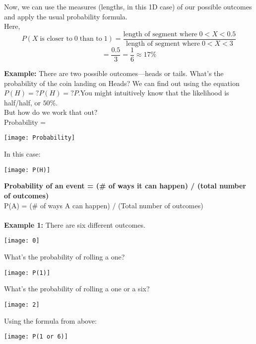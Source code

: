 \documentclass{article}
\begin{document}
\noindent Now, we can use the measures (lengths, in this 1D case) of our possible outcomes and apply the usual probability formula. \\ Here, \[P(X \;  \text{is closer to} \; 0 \; \text{than to} \; 1) = \frac{\text{length of segment where} \; 0<X<0.5}{\text{length of segment where} \; 0<X<3}\]
\[= \frac{0.5}{3} = \frac{1}{6} \approx 17\%\]

\noindent \textbf{Example:} There are two possible outcomes—heads or tails.
What’s the probability of the coin landing on Heads? We can find out using the equation $P(H) = ?P(H)=?P$.You might intuitively know that the likelihood is half/half, or $50$\%.\\

\noindent But how do we work that out?\\ Probability = \\
\begin{center}
	\texttt{[image: Probability]}
\end{center}

\noindent In this case:\\
\begin{center}
	\texttt{[image: P(H)]}
\end{center}

\noindent \textbf{Probability of an event = (\# of ways it can happen) / (total number of outcomes)}\\
\noindent P(A) = (\# of ways A can happen) / (Total number of outcomes)\\\\

\noindent \textbf{Example 1:} There are six different outcomes.\\
\begin{center}
	\texttt{[image: 0]}
\end{center}

\noindent What’s the probability of rolling a one?\\
\begin{center}
	\texttt{[image: P(1)]}
\end{center}

\noindent What’s the probability of rolling a one or a six?\\
\begin{center}
	\texttt{[image: 2]}
\end{center}

\noindent Using the formula from above:\\
\begin{center}
	\texttt{[image: P(1 or 6)]}
\end{center}
\end{document}

